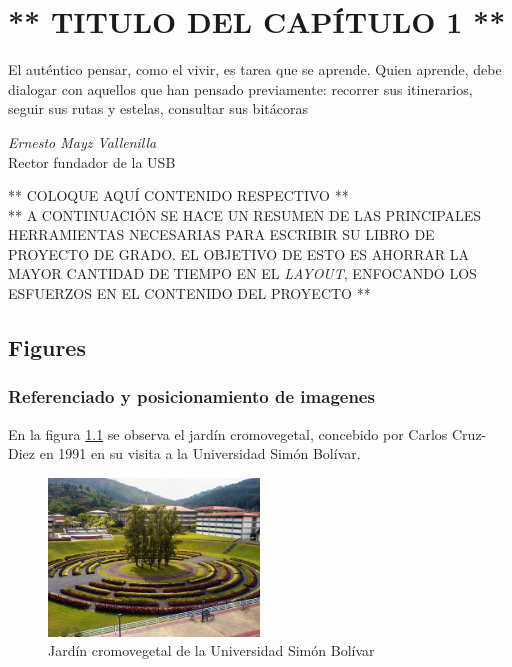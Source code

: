 \chapter{** TITULO DEL CAPÍTULO 1 **}
\thispagestyle{empty}

\abovedisplayskip=0pt
\belowdisplayskip=10pt
\abovedisplayshortskip=0pt
\belowdisplayshortskip=10pt

\epigraph{\flushright El auténtico pensar, como el vivir, es tarea que se aprende. Quien aprende, debe dialogar con
aquellos que han pensado previamente: recorrer sus itinerarios, seguir sus rutas y estelas, consultar
sus bitácoras}{\textit{Ernesto Mayz Vallenilla}\\Rector fundador de la USB}

** COLOQUE AQUÍ CONTENIDO RESPECTIVO **\\

** A CONTINUACIÓN SE HACE UN RESUMEN DE LAS PRINCIPALES HERRAMIENTAS NECESARIAS PARA ESCRIBIR SU LIBRO DE PROYECTO DE GRADO. EL OBJETIVO DE ESTO ES AHORRAR LA MAYOR CANTIDAD DE TIEMPO EN EL \textit{LAYOUT}, ENFOCANDO LOS ESFUERZOS EN EL CONTENIDO DEL PROYECTO **

\section{Figures}

\subsection{Referenciado y posicionamiento de imagenes}

En la figura \ref{fig:cromovegetal} se observa el jardín cromovegetal, concebido por Carlos Cruz-Diez en 1991 en su visita a la Universidad Simón Bolívar.


\begin{figure}[H]
\centering
\includegraphics[width=0.50\textwidth]{2_MainMatter/Capitulo1/Imagenes/cromovegetal.jpg}
\caption{Jardín cromovegetal de la Universidad Simón Bolívar}
\label{fig:cromovegetal}
\end{figure}

